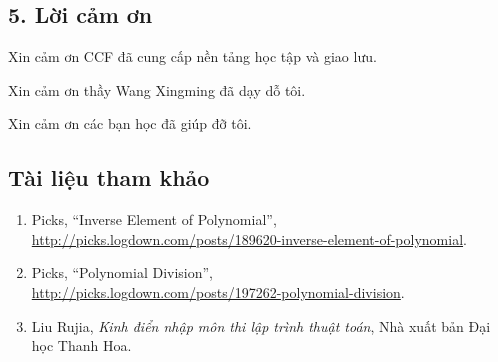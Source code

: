 \documentclass[11pt]{article}
\begin{document}
\subsection*{5. Lời cảm ơn}

Xin cảm ơn CCF đã cung cấp nền tảng học tập và giao lưu.

Xin cảm ơn thầy Wang Xingming đã dạy dỗ tôi.

Xin cảm ơn các bạn học đã giúp đỡ tôi.

\subsection*{Tài liệu tham khảo}

\begin{sloppypar}
\begin{enumerate}
  \item Picks, ``Inverse Element of Polynomial'',
  \\
  \url{http://picks.logdown.com/posts/189620-inverse-element-of-polynomial}.
  \item Picks, ``Polynomial Division'',
  \\
  \url{http://picks.logdown.com/posts/197262-polynomial-division}.
  \item Liu Rujia, \emph{Kinh điển nhập môn thi lập trình thuật toán}, Nhà
  xuất bản Đại học Thanh Hoa.
\end{enumerate}
\end{sloppypar}
\end{document}
